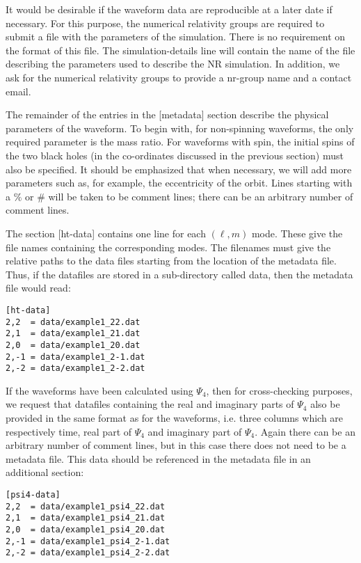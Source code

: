 \documentclass[10pt]{ligodcc}
\renewcommand{\texttt}[1]{{\ttfamily\color{blue}#1}}
\begin{document}
It would be desirable if the waveform data are reproducible at
a later date if necessary.  For this purpose, the numerical relativity
groups are required to submit a file with the parameters of the
simulation.  There is no requirement on the format of this file.  
The \texttt{simulation-details} line will contain the name of the file
describing the parameters used to describe the NR simulation.  In
addition, we ask for the numerical relativity groups to provide a
\texttt{nr-group} name and a contact \texttt{email}.

The remainder of the entries in the \texttt{[metadata]} section describe
the physical parameters of the waveform.  To begin with, for
non-spinning waveforms, the only required parameter is the mass ratio.
For waveforms with spin, the initial spins of the two black holes (in
the co-ordinates discussed in the previous section) must also be
specified. It should be emphasized that when necessary, we will add more
parameters such as, for example, the eccentricity of the orbit. Lines
starting with a $\%$ or $\#$ will be taken to be comment lines; there
can be an arbitrary number of comment lines.

The section \texttt{[ht-data]} contains one line for each $(\ell,m)$
mode.  These give the file names containing the corresponding modes.
The filenames must give the relative paths to the data files starting
from the location of the metadata file.  Thus, if the datafiles are
stored in a sub-directory called \texttt{data}, then the metadata file
would read:
\begin{verbatim}
[ht-data]
2,2  = data/example1_22.dat
2,1  = data/example1_21.dat
2,0  = data/example1_20.dat
2,-1 = data/example1_2-1.dat
2,-2 = data/example1_2-2.dat
\end{verbatim}

If the waveforms have been calculated using $\Psi_4$, then for
cross-checking purposes, we request that datafiles containing the real
and imaginary parts of $\Psi_4$ also be provided in the same format as
for the waveforms, i.e. three columns which are respectively time, real
part of $\Psi_4$ and imaginary part of $\Psi_4$.  Again there can be an
arbitrary number of comment lines, but in this case there does not need
to be a metadata file.  This data should be referenced in the metadata
file in an additional section:

\begin{verbatim}
[psi4-data]
2,2  = data/example1_psi4_22.dat
2,1  = data/example1_psi4_21.dat
2,0  = data/example1_psi4_20.dat
2,-1 = data/example1_psi4_2-1.dat
2,-2 = data/example1_psi4_2-2.dat
\end{verbatim}
\end{document}
